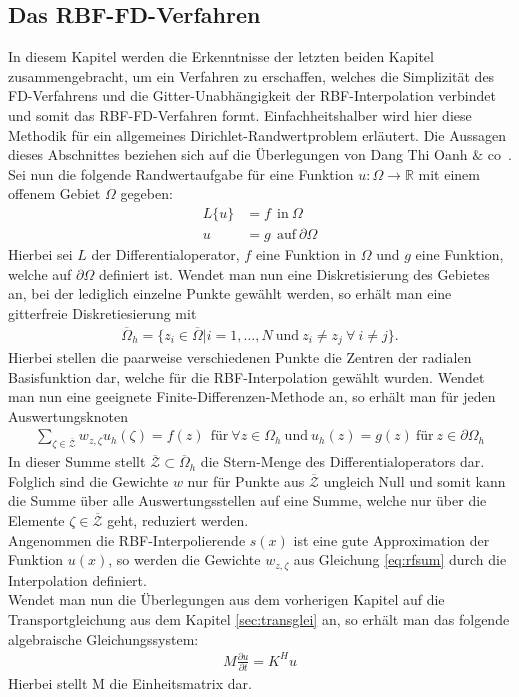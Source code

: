 \documentclass[12pt,titlepage]{article}
\begin{document}
\subsection{Das RBF-FD-Verfahren}
In diesem Kapitel werden die Erkenntnisse der letzten beiden Kapitel zusammengebracht, um ein Verfahren zu erschaffen, welches die Simplizität des FD-Verfahrens und die Gitter-Unabhängigkeit der RBF-Interpolation verbindet und somit das RBF-FD-Verfahren formt. Einfachheitshalber wird hier diese Methodik für ein allgemeines Dirichlet-Randwertproblem erläutert. Die Aussagen dieses Abschnittes beziehen sich auf die Überlegungen von Dang Thi Oanh $\&$ co~\cite{oanh2017adaptive}.\\
Sei nun die folgende Randwertaufgabe für eine Funktion $u:\Omega\rightarrow\mathbb{R}$ mit einem offenem Gebiet $\Omega$ gegeben:
\begin{align}
 L\{u\}&=f~~\text{in}~\Omega\nonumber\\
 u&=g~~\text{auf}~\partial\Omega\nonumber
\end{align}
Hierbei sei $L$ der Differentialoperator, $f$ eine Funktion in $\Omega$ und $g$ eine Funktion, welche auf $\partial\Omega$ definiert ist. Wendet man nun eine Diskretisierung des Gebietes an, bei der lediglich einzelne Punkte gewählt werden, so erhält man eine gitterfreie Diskretiesierung mit 
\begin{align}
\overline{\Omega}_h=\{z_i\in\overline{\Omega}|i=1,\dots,N~\text{und}~z_i\neq z_j~\forall~i\neq j\}.
\end{align}
Hierbei stellen die paarweise verschiedenen Punkte die Zentren der radialen Basisfunktion dar, welche für die RBF-Interpolation gewählt wurden. Wendet man nun eine geeignete Finite-Differenzen-Methode an, so erhält man für jeden Auswertungsknoten
\begin{align}
 \sum_{\zeta\in\overline{\mathcal{Z}}}w_{z,\zeta}u_h(\zeta)=f(z)~~\text{für}~\forall z\in\Omega_h~\text{und}~u_h(z)=g(z)~\text{für}~z\in\partial\Omega_h\label{eq:rfsum}
\end{align}
In dieser Summe stellt $\mathcal{\overline{Z}}\subset\overline{\Omega}_h$ die Stern-Menge des Differentialoperators dar. Folglich sind die Gewichte $w$ nur für Punkte aus $\mathcal{\overline{Z}}$ ungleich Null und somit kann die Summe über alle Auswertungsstellen auf eine Summe, welche nur über die Elemente $\zeta\in\mathcal{\overline{Z}}$ geht, reduziert werden.\\
Angenommen die RBF-Interpolierende $s(x)$ ist eine gute Approximation der Funktion $u(x)$, so werden die Gewichte $w_{z,\zeta}$ aus Gleichung \eqref{eq:rfsum} durch die Interpolation definiert.\\
Wendet man nun die Überlegungen aus dem vorherigen Kapitel auf die Transportgleichung aus dem Kapitel \ref{sec:transglei} an, so erhält man das folgende algebraische Gleichungssystem:
\begin{align}
 M\frac{\partial u}{\partial t}=K^Hu\label{eq:algTrans}
\end{align}
Hierbei stellt M die Einheitsmatrix dar.
\pagebreak
\end{document}

